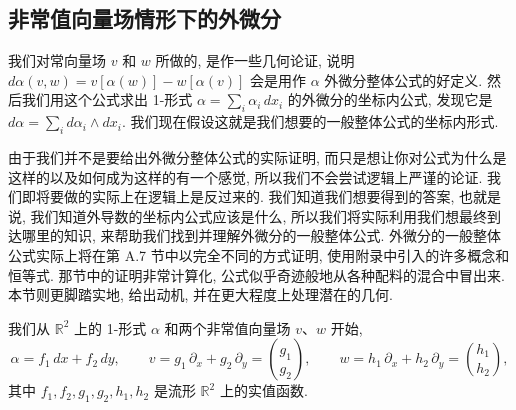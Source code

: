 \subsection{非常值向量场情形下的外微分}

我们对常向量场 $v$ 和 $w$ 所做的, 是作一些几何论证, 说明 $d\alpha(v,w)=v[\alpha(w)]-w[\alpha(v)]$ 会是用作 $\alpha$ 外微分整体公式的好定义. 然后我们用这个公式求出 1-形式 $\alpha=\sum_i\alpha_i\,dx_i$ 的外微分的坐标内公式, 发现它是 $d\alpha=\sum_i d\alpha_i\wedge dx_i$. 我们现在假设这就是我们想要的一般整体公式的坐标内形式.

由于我们并不是要给出外微分整体公式的实际证明, 而只是想让你对公式为什么是这样的以及如何成为这样的有一个感觉, 所以我们不会尝试逻辑上严谨的论证. 我们即将要做的实际上在逻辑上是反过来的. 我们知道我们想要得到的答案, 也就是说, 我们知道外导数的坐标内公式应该是什么, 所以我们将实际利用我们想最终到达哪里的知识, 来帮助我们找到并理解外微分的一般整体公式. 外微分的一般整体公式实际上将在第 A.7 节中以完全不同的方式证明, 使用附录中引入的许多概念和恒等式. 那节中的证明非常计算化, 公式似乎奇迹般地从各种配料的混合中冒出来. 本节则更脚踏实地, 给出动机, 并在更大程度上处理潜在的几何.

我们从 $\mathbb{R}^2$ 上的 1-形式 $\alpha$ 和两个非常值向量场 $v$、$w$ 开始, 
\[
\alpha=f_1\,dx+f_2\,dy,\qquad
v=g_1\,\partial_x+g_2\,\partial_y=\binom{g_1}{g_2},\qquad
w=h_1\,\partial_x+h_2\,\partial_y=\binom{h_1}{h_2},
\]
其中 $f_1,f_2,g_1,g_2,h_1,h_2$ 是流形 $\mathbb{R}^2$ 上的实值函数.

